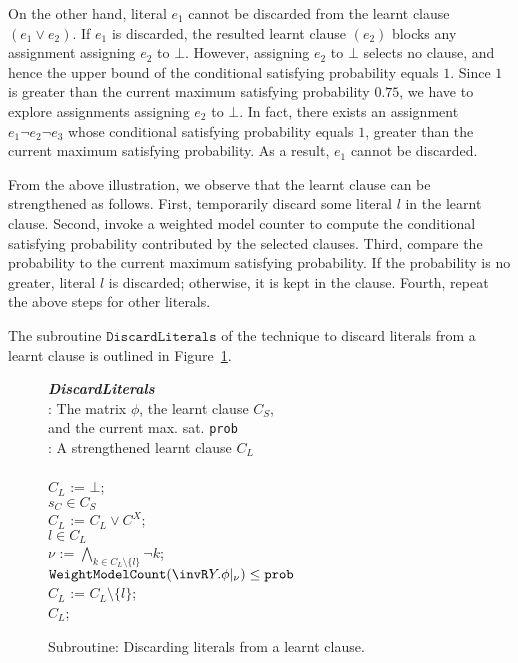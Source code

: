 On the other hand,
literal $e_1$ cannot be discarded from the learnt clause $(e_1 \lor e_2)$.
If $e_1$ is discarded,
the resulted learnt clause $(e_2)$ blocks any assignment assigning $e_2$ to $\bot$.
However, assigning $e_2$ to $\bot$ selects no clause,
and hence the upper bound of the conditional satisfying probability equals $1$.
Since $1$ is greater than the current maximum satisfying probability $0.75$,
we have to explore assignments assigning $e_2$ to $\bot$.
In fact, there exists an assignment $e_1 \lnot e_2 \lnot e_3$ whose conditional satisfying probability equals $1$,
greater than the current maximum satisfying probability.
As a result, $e_1$ cannot be discarded.

From the above illustration,
we observe that the learnt clause can be strengthened as follows.
First, temporarily discard some literal $l$ in the learnt clause.
Second, invoke a weighted model counter to compute the conditional satisfying probability contributed by the selected clauses.
Third, compare the probability to the current maximum satisfying probability.
If the probability is no greater, literal $l$ is discarded; otherwise, it is kept in the clause.
Fourth, repeat the above steps for other literals.

\iffalse
    The subroutine $\mathtt{DiscardLiterals}$ of the technique to discard literals from a learnt clause is outlined in Figure~\ref{fig:partial}.
    \begin{figure}[h]
        \mbox{}\hrulefill \vspace{-.6em}
        \small
        \begin{program}
            \>  {\bf \textit{DiscardLiterals}}\\
            \> \> \INPUT: The matrix $\phi$, the learnt clause $C_S$,\\
            \> \> \> \> \> and the current max. sat. \texttt{prob}\\
            \> \> \OUTPUT: A strengthened learnt clause $C_L$\\
            \> \> \BEGIN\\
            \>  \> \> $C_L$ := $\bot$;\\
            \>  \> \> \FOREACH $s_C \in C_S$\\
            \>  \> \> \> $C_L$ := $C_L \vee C^X$;\\
            \>  \> \> \FOREACH $l \in C_L$\\
            \>  \> \> \> $\nu$ := $\bigwedge_{k \in C_L \setminus \{l\}}\neg k$;\\
            \>  \> \> \> \IF \> $\mathtt{WeightModelCount}(\invR Y.\phi|_{\nu}) \leq \texttt{prob}$\\
            \>  \> \> \> \> $C_L$ := $C_L \setminus \{l\}$;\\
            \>  \> \> \RETURN $C_L$;\\
            \> \> \END
        \end{program}
        \vspace{-1.2em} \mbox{}\hrulefill \caption{\small Subroutine: Discarding literals from a learnt clause.}
        \label{fig:partial}
    \end{figure}

